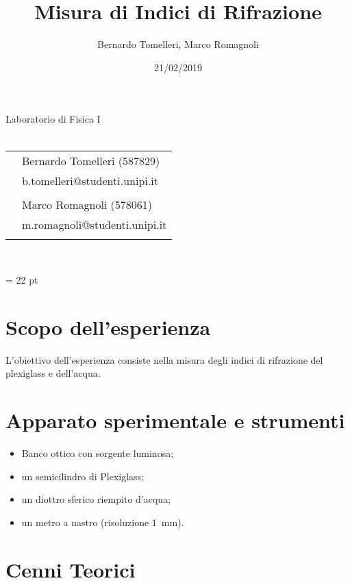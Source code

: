 \documentclass{article}[a4paper,11pt]
\title{Misura di Indici di Rifrazione}
\author{Bernardo Tomelleri, Marco Romagnoli}
\date{21/02/2019}
\begin{document}
\begin{titlepage}
	\begin{center}
		{\huge{Laboratorio di Fisica I}}\\\vspace*{7mm} %
		{\huge{\textbf{\thetitle}}}\\\vspace*{15mm}
		\begin{tabular}{ll}
		& Bernardo Tomelleri (587829) \\
		& b.tomelleri@studenti.unipi.it\\ \\
		& Marco Romagnoli (578061) \\
		& m.romagnoli@studenti.unipi.it \\ \\
		\end{tabular}\\\vspace*{5mm}
		{\thedate}
	\end{center}
\end{titlepage}
\makeatother
\restoregeometry
\newpage

\tableofcontents

\vspace{2cm}

\emergencystretch = 22 pt
\section{Scopo dell'esperienza}
L'obiettivo dell'esperienza consiste nella misura degli indici di rifrazione del plexiglass e dell'acqua.

\section{Apparato sperimentale e strumenti}
\begin{itemize}
\item Banco ottico con sorgente luminosa;
\item un semicilindro di Plexiglass;
\item un diottro sferico riempito d'acqua;
\item un metro a nastro (risoluzione $1$~mm).
\end{itemize}

\section{Cenni Teorici}
\end{document}
